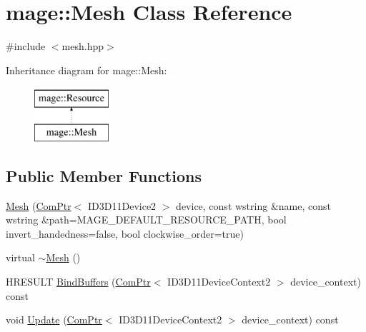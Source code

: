 \hypertarget{classmage_1_1_mesh}{}\section{mage\+:\+:Mesh Class Reference}
\label{classmage_1_1_mesh}


{\ttfamily \#include $<$mesh.\+hpp$>$}

Inheritance diagram for mage\+:\+:Mesh\+:\begin{figure}[H]
\begin{center}
\leavevmode
\includegraphics[height=2.000000cm]{classmage_1_1_mesh}
\end{center}
\end{figure}
\subsection*{Public Member Functions}
\begin{DoxyCompactItemize}
\item 
\hyperlink{classmage_1_1_mesh_aec88dd772e8c8d25aa9c263ab155f78b}{Mesh} (\hyperlink{namespacemage_ae74f374780900893caa5555d1031fd79}{Com\+Ptr}$<$ I\+D3\+D11\+Device2 $>$ device, const wstring \&name, const wstring \&path=M\+A\+G\+E\+\_\+\+D\+E\+F\+A\+U\+L\+T\+\_\+\+R\+E\+S\+O\+U\+R\+C\+E\+\_\+\+P\+A\+TH, bool invert\+\_\+handedness=false, bool clockwise\+\_\+order=true)
\item 
virtual \hyperlink{classmage_1_1_mesh_ab7e701f7fcdc611479875a98c465da42}{$\sim$\+Mesh} ()
\item 
H\+R\+E\+S\+U\+LT \hyperlink{classmage_1_1_mesh_af1116b9b7d66aba46412af418361c5b7}{Bind\+Buffers} (\hyperlink{namespacemage_ae74f374780900893caa5555d1031fd79}{Com\+Ptr}$<$ I\+D3\+D11\+Device\+Context2 $>$ device\+\_\+context) const
\item 
void \hyperlink{classmage_1_1_mesh_acef4f55140f0f842791ea4dfa25b7598}{Update} (\hyperlink{namespacemage_ae74f374780900893caa5555d1031fd79}{Com\+Ptr}$<$ I\+D3\+D11\+Device\+Context2 $>$ device\+\_\+context) const
\end{DoxyCompactItemize}

